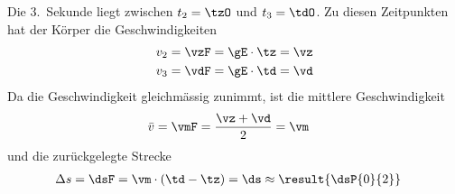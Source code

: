 Die 3.~Sekunde liegt zwischen $t_2 = \tzO$ und $t_3 = \tdO$. Zu diesen Zeitpunkten hat der Körper die Geschwindigkeiten
\begin{align}
 v_2 &= \vzF = \gE\cdot\tz = \vz \\
 v_3 &= \vdF = \gE\cdot\td = \vd
\end{align}
Da die Geschwindigkeit gleichmässig zunimmt, ist die mittlere Geschwindigkeit
\begin{align}
 \bar v &= \vmF = \frac{\vz+\vd}{2} = \vm
\end{align}
und die zurückgelegte Strecke
\begin{align}
 \Delta s &= \dsF = \vm\cdot\left(\td-\tz\right) = \ds \approx \result{\dsP{0}{2}}
\end{align}
